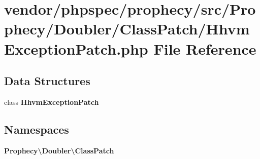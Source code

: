 \section{vendor/phpspec/prophecy/src/\+Prophecy/\+Doubler/\+Class\+Patch/\+Hhvm\+Exception\+Patch.php File Reference}
\label{_hhvm_exception_patch_8php}
\subsection*{Data Structures}
\begin{DoxyCompactItemize}
\item 
class {\bf Hhvm\+Exception\+Patch}
\end{DoxyCompactItemize}
\subsection*{Namespaces}
\begin{DoxyCompactItemize}
\item 
 {\bf Prophecy\textbackslash{}\+Doubler\textbackslash{}\+Class\+Patch}
\end{DoxyCompactItemize}
